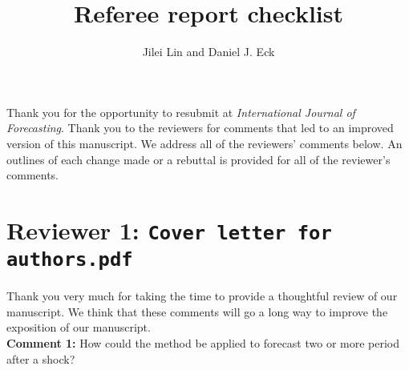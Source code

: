 \documentclass[12pt]{article}
\title{Referee report checklist}
\author{Jilei Lin and Daniel J. Eck}
\date{}
\begin{document}
\maketitle

Thank you for the opportunity to resubmit at \emph{International Journal of Forecasting}. Thank you to the reviewers for comments that led to an improved version of this manuscript. We address all of the reviewers' comments below. An outlines of each change made or a rebuttal is provided for all of the reviewer's comments.

\newpage
\section*{Reviewer 1: \texttt{Cover letter for authors.pdf}}

Thank you very much for taking the time to provide a thoughtful review of our manuscript. We think that these comments will go a long way to improve the exposition of our manuscript. \\


{\bf  Comment 1:} How could the method be applied to forecast two or more period after a shock? \\
\end{document}
